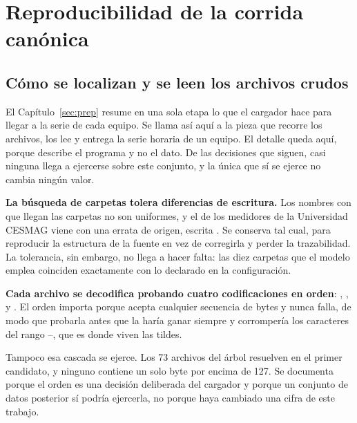 %
%
\section{Reproducibilidad de la corrida canónica}
\label{anx:repro}
\justifying

\subsection{Cómo se localizan y se leen los archivos crudos}
\label{sub:repro-lectura}

El Capítulo~\ref{sec:prep} resume en una sola etapa lo que el cargador
hace para llegar a la serie de cada equipo. Se llama así aquí a la pieza
que recorre los archivos, los lee y entrega la serie horaria de un equipo. El detalle queda aquí, porque
describe el programa y no el dato. De las decisiones que siguen, casi
ninguna llega a ejercerse sobre este conjunto, y la única que sí se
ejerce no cambia ningún valor.

\textbf{La búsqueda de carpetas tolera diferencias de escritura.} Los
nombres con que llegan las carpetas no son uniformes, y el de los
medidores de la Universidad CESMAG viene con una errata de origen, escrita
. Se conserva tal cual, para reproducir la estructura de
la fuente en vez de corregirla y perder la trazabilidad. La tolerancia, sin
embargo, no llega a hacer falta: las diez carpetas que el modelo emplea
coinciden exactamente con lo declarado en la configuración.

\textbf{Cada archivo se decodifica probando cuatro codificaciones en
orden}: , ,  y . El
orden importa porque  acepta cualquier secuencia de bytes y
nunca falla, de modo que probarla antes que  la haría ganar
siempre y corrompería los caracteres del rango --,
que es donde viven las tildes.

Tampoco esa cascada se ejerce. Los 73 archivos del árbol resuelven en el
primer candidato, y ninguno contiene un solo byte por encima de 127. Se
documenta porque el orden es una decisión deliberada del cargador y porque
un conjunto de datos posterior sí podría ejercerla, no porque haya
cambiado una cifra de este trabajo.

